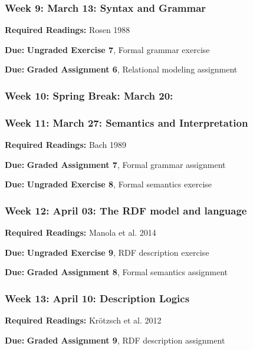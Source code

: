 \documentclass[]{article}
\begin{document}
\subsubsection{Week 9: March 13: Syntax and
Grammar}\label{week-9-march-13-syntax-and-grammar}

\textbf{Required Readings:} Rosen 1988

\textbf{Due:} \textbf{Ungraded Exercise 7}, Formal grammar exercise

\textbf{Due:} \textbf{Graded Assignment 6}, Relational modeling
assignment

\subsubsection{Week 10: Spring Break: March
20:}\label{week-10-spring-break-march-20}

\subsubsection{Week 11: March 27: Semantics and
Interpretation}\label{week-11-march-27-semantics-and-interpretation}

\textbf{Required Readings:} Bach 1989

\textbf{Due:} \textbf{Graded Assignment 7}, Formal grammar assignment

\textbf{Due:} \textbf{Ungraded Exercise 8}, Formal semantics exercise

\subsubsection{Week 12: April 03: The RDF model and
language}\label{week-12-april-03-the-rdf-model-and-language}

\textbf{Required Readings:} Manola et al. 2014

\textbf{Due:} \textbf{Ungraded Exercise 9}, RDF description exercise

\textbf{Due:} \textbf{Graded Assignment 8}, Formal semantics assignment

\subsubsection{Week 13: April 10: Description
Logics}\label{week-13-april-10-description-logics}

\textbf{Required Readings:} Krötzsch et al. 2012

\textbf{Due:} \textbf{Graded Assignment 9}, RDF description assignment
\end{document}
